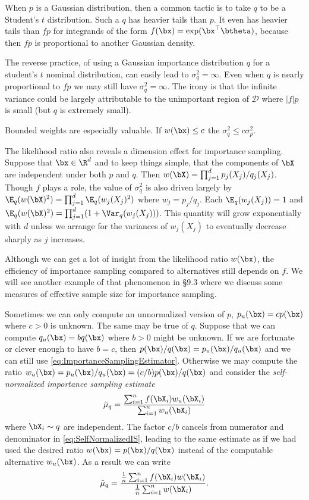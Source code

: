 When $p$ is a Gaussian distribution, then a common tactic is to take $q$ to be a Student's $t$ distribution. Such a $q$ has heavier tails than $p$. It even has heavier tails than $fp$ for integrands of the form $f(\bx) = \exp(\bx^\top \btheta)$, because then $fp$ is proportional to another Gaussian density.

The reverse practice, of using a Gaussian importance distribution $q$ for a student's $t$ nominal distribution, can easily lead to $\sigma_q^2 = \infty$. Even when $q$ is nearly proportional to $fp$ we may still have $\sigma_q^2 = \infty$. The irony is that the infinite variance could be largely attributable to the unimportant region of $\mathcal{D}$ where $|f|p$ is small (but $q$ is extremely small).

Bounded weights are especially valuable. If $w(\bx) \leq c$ the $\sigma_q^2 \leq c \sigma_p^2$.

The likelihood ratio also reveals a dimension effect for importance sampling. Suppose that $\bx \in \R^d$ and to keep things simple, that the components of $\bX$ are independent under both $p$ and $q$. Then $w(\bX) = \prod_{j=1}^d p_j(X_j)/q_j(X_j)$. Though $f$ plays a role, the value of $\sigma_q^2$ is also driven largely by $\E_q(w(\bX)^2) = \prod_{j=1}^d \E_q(w_j(X_j)^2)$ where $w_j = p_j/q_j$. Each $\E_q(w_j(X_j)) = 1$ and $\E_q(w(\bX)^2) = \prod_{j=1}^d (1 + \Var_q(w_j(X_j)))$. This quantity will grow exponentially with $d$ unless we arrange for the variances of $w_j(X_j)$ to eventually decrease sharply as $j$ increases.

Although we can get a lot of insight from the likelihood ratio $w(\bx)$, the efficiency of importance sampling compared to alternatives still depends on $f$. We will see another example of that phenomenon in \S 9.3 where we discuss some measures of effective sample size for importance sampling.

Sometimes we can only compute an unnormalized version of $p$, $p_u(\bx) = cp(\bx)$ where $c > 0$ is unknown. The same may be true of $q$. Suppose that we can compute $q_u(\bx) = bq(\bx)$ where $b > 0$ might be unknown. If we are fortunate or clever enough to have $b = c$, then $p(\bx)/q(\bx) = p_u(\bx)/q_u(\bx)$ and we can still use \eqref{eq:ImportanceSamplingEstimator}. Otherwise we may compute the ratio $w_u(\bx) = p_u(\bx)/q_u(\bx) = (c/b)p(\bx)/q(\bx)$ and consider the \textit{self-normalized importance sampling estimate}
\begin{equation}
	\tilde{\mu}_q = \frac{\sum_{i=1}^n f(\bX_i)w_u(\bX_i)}{\sum_{i=1}^n w_u(\bX_i)}
	\label{eq:SelfNormalizedIS}
\end{equation}
where $\bX_i \sim q$ are independent. The factor $c/b$ cancels from numerator and denominator in \eqref{eq:SelfNormalizedIS}, leading to the same estimate as if we had used the desired ratio $w(\bx) = p(\bx)/q(\bx)$ instead of the computable alternative $w_u(\bx)$. As a result we can write
\begin{equation}
	\tilde{\mu}_q = \frac{\frac{1}{n} \sum_{i=1}^n f(\bX_i)w(\bX_i)}{\frac{1}{n} \sum_{i=1}^n w(\bX_i)}.
	\label{eq:SelfNormalizedISStandard}
\end{equation}

